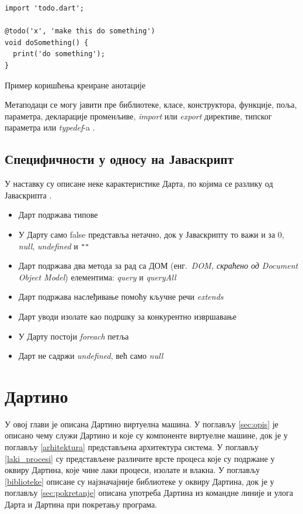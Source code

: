 \documentclass[12pt,oneside]{memoir}
\begin{document}
\begin{listing}
\begin{verbatim}
import 'todo.dart';

@todo('x', 'make this do something')
void doSomething() {
  print('do something');
}
\end{verbatim}
\caption{Пример коришћења креиране анотације}
\label{use_anotation}
\end{listing}
Метаподаци се могу јавити пре библиотеке, класе, конструктора, функције, поља, параметра, декларације променљиве, \textit{import} или \textit{export} директиве, типског параметра или \textit{typedef}-a \cite{dart, dart1}.
\section{Специфичности у односу на Јаваскрипт}
\label{specificnosti}
У наставку су описане неке карактеристике Дарта, по којима се разлику од Јаваскрипта \cite{dart, dart1}.
\begin{itemize}
\item Дарт подржава типове
\item У Дарту само false представља нетачно, док у Јаваскрипту то важи и за 0, \textit{null}, \textit{undefined} и \verb|""|
\item Дарт подржава два метода за рад са ДОМ (енг.~\textit{DOM, скраћено од \textit{Document Object Model}}) елементима: \textit{query} и \textit{queryAll}
\item Дарт подржава наслеђивање помоћу кључне речи \textit{extends}
\item Дарт уводи изолате као подршку за конкурентно извршавање
\item У Дарту постоји \textit{foreach} петља
\item Дарт не садржи \textit{undefined}, већ само \textit{null}
\end{itemize}

\chapter{Дартино}
\label{chp:dartino}
У овој глави је описана Дартино виртуелна машина. У поглављу \ref{sec:opis} је описано чему служи Дартино и које су компоненте виртуелне машине, док је у поглављу \ref{arhitektura} представљена архитектура система. У поглављу \ref{laki_procesi} су представљене различите врсте процеса које су подржане у оквиру Дартина, које чине лаки процеси, изолате и влакна. У поглављу \ref{biblioteke} описане су најзначајније библиотеке у оквиру Дартина, док је у поглављу \ref{sec:pokretanje} описана употреба Дартина из командне линије и улога Дарта и Дартина при покретању програма.
\end{document}
